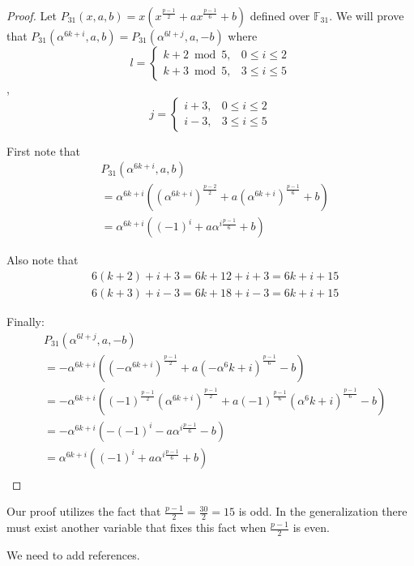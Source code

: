\documentclass[12pt]{article}
\begin{document}
\begin{proof}
	Let $P_{31}(x,a,b) = x(x^{\frac{p-1}{2}}+ax^{\frac{p-1}{6}}+b)$ defined over $\mathbb{F}_{31}$. We will prove that $P_{31}(\alpha^{6k+i},a,b) = P_{31}(\alpha^{6l+j},a,-b)$ where
	$$
	l =
	\begin{cases}
	k+2 \bmod{5}, & 0 \leq i \leq 2 \\
	k+3 \bmod{5}, & 3 \leq i \leq 5
	\end{cases}
	$$
	,
	$$
	j =
	\begin{cases}
	i+3, & 0 \leq i \leq 2 \\
	i-3, & 3 \leq i \leq 5
	\end{cases}
	$$
	
	First note that
	\begin{align*}
	&P_{31}(\alpha^{6k+i},a,b) \\
	&=\alpha^{6k+i}((\alpha^{6k+i})^{\frac{p-2}{2}}+a(\alpha^{6k+i})^{\frac{p-1}{6}}+b) \\
	&=\alpha^{6k+i}((-1)^{i}+a\alpha^{i\frac{p-1}{6}}+b)
	\end{align*}

	Also note that
	\begin{align*}
	&6(k+2)+i+3=6k+12+i+3=6k+i+15 \\
	&6(k+3)+i-3=6k+18+i-3=6k+i+15
	\end{align*}

	Finally:
	\begin{align*}
	&P_{31}(\alpha^{6l+j},a,-b)	\\
	&= -\alpha^{6k+i}((-\alpha^{6k+i})^\frac{p-1}{2}+a(-\alpha^6k+i)^\frac{p-1}{6}-b) \\
	&= -\alpha^{6k+i}((-1)^{\frac{p-1}{2}}(\alpha^{6k+i})^\frac{p-1}{2}+a(-1)^{\frac{p-1}{6}}(\alpha^6k+i)^\frac{p-1}{6}-b) \\
	&= -\alpha^{6k+i}(-(-1)^{i}-a\alpha^{i\frac{p-1}{6}}-b) \\
	&= \alpha^{6k+i}((-1)^{i}+a\alpha^{i\frac{p-1}{6}}+b) \\
	\end{align*}
	
\end{proof}

Our proof utilizes the fact that $\frac{p-1}{2} = \frac{30}{2}=15$ is odd. In the generalization there must exist another variable that fixes this fact when $\frac{p-1}{2}$ is even.


\begin{thebibliography}{}

We need to add references.

\end{thebibliography}
\end{document}
